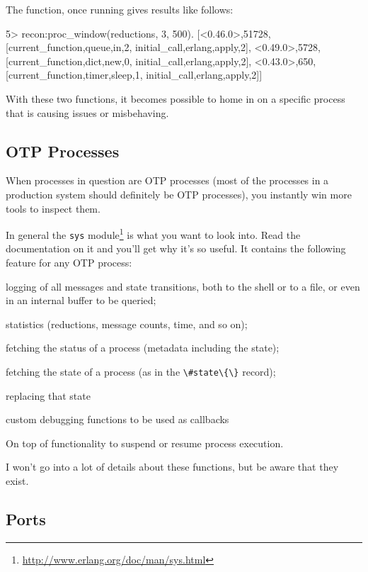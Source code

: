 \documentclass[11pt, oneside]{book}   	%
\newcommand{\module}[1]{\Verb`#1`}
\newcommand{\expression}[1]{\Verb`#1`}
\begin{document}
The function, once running gives results like follows:

\begin{VerbatimEshell}
5> recon:proc_window(reductions, 3, 500).
[{<0.46.0>,51728,
  [{current_function,{queue,in,2}},
   {initial_call,{erlang,apply,2}}]},
 {<0.49.0>,5728,
  [{current_function,{dict,new,0}},
   {initial_call,{erlang,apply,2}}]},
 {<0.43.0>,650,
  [{current_function,{timer,sleep,1}},
   {initial_call,{erlang,apply,2}}]}]
\end{VerbatimEshell}

With these two functions, it becomes possible to home in on a specific process that is causing issues or misbehaving.


\subsection{OTP Processes}

When processes in question are OTP processes (most of the processes in a production system should definitely be OTP processes), you instantly win more tools to inspect them.

In general the \module{sys} module\footnote{\href{http://www.erlang.org/doc/man/sys.html}{http://www.erlang.org/doc/man/sys.html}} is what you want to look into. Read the documentation on it and you'll get why it's so useful. It contains the following feature for any OTP process:

\begin{itemize*}
	\item logging of all messages and state transitions, both to the shell or to a file, or even in an internal buffer to be queried;
	\item statistics (reductions, message counts, time, and so on);
	\item fetching the status of a process (metadata including the state);
	\item fetching the state of a process (as in the \expression{\#state\{\}} record);
	\item replacing that state
	\item custom debugging functions to be used as callbacks
\end{itemize*}

On top of functionality to suspend or resume process execution.

I won't go into a lot of details about these functions, but be aware that they exist.

\subsection{Ports}
\end{document}
